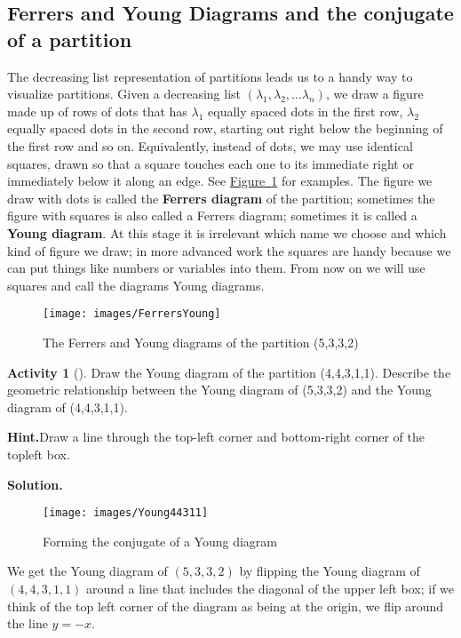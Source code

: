 \documentclass[10pt,]{book}
\newcommand{\terminology}[1]{\textbf{#1}}
\theoremstyle{plain}
\theoremstyle{definition}
\newtheorem{activity}[project]{Activity}
\numberwithin{equation}{chapter}
\begin{document}
\subsection[{Ferrers and Young Diagrams and the conjugate of a partition}]{Ferrers and Young Diagrams and the conjugate of a partition}\label{subsection-38}
The decreasing list representation of partitions leads us to a handy way to visualize partitions. Given a decreasing list \((\lambda_1,\lambda_2,\ldots \lambda_n)\), we draw a figure made up of rows of dots that has \(\lambda_1\) equally spaced dots in the first row, \(\lambda_2\) equally spaced dots in the second row, starting out right below the beginning of the first row and so on. Equivalently, instead of dots, we may use identical squares, drawn so that a square touches each one to its immediate right or immediately below it along an edge. See \hyperref[FerrersYoung]{Figure~\ref{FerrersYoung}} for examples. The figure we draw with dots is called the \terminology{Ferrers diagram} of the partition; sometimes the figure with squares is also called a Ferrers diagram; sometimes it is called a \terminology{Young diagram}. At this stage it is irrelevant which name we choose and which kind of figure we draw; in more advanced work the squares are handy because we can put things like numbers or variables into them.  From now on we will use squares and call the diagrams Young diagrams.%
\begin{figure}
\centering
\texttt{[image: images/FerrersYoung]}
\caption{The Ferrers and Young diagrams of the partition (5,3,3,2)\label{FerrersYoung}}
\end{figure}
\begin{activity}[]\label{activity-151}
Draw the Young diagram of the partition (4,4,3,1,1). Describe the geometric relationship between the Young diagram of (5,3,3,2) and the Young diagram of (4,4,3,1,1).%
\par\medskip\noindent%
\textbf{Hint.}\quad Draw a line through the top-left corner and bottom-right corner of the topleft box.%
\par\medskip\noindent%
\textbf{Solution.}\quad \leavevmode%
\begin{figure}
\centering
\texttt{[image: images/Young44311]}
\caption{Forming the conjugate of a Young diagram\label{Young44311}}
\end{figure}
We get the Young diagram of \((5,3,3,2)\) by flipping the Young diagram of \((4,4,3,1,1)\) around a line that includes the diagonal of the upper left box; if we think of the top left corner of the diagram as being at the origin, we flip around the line \(y=-x\).%
\end{activity}
\end{document}
